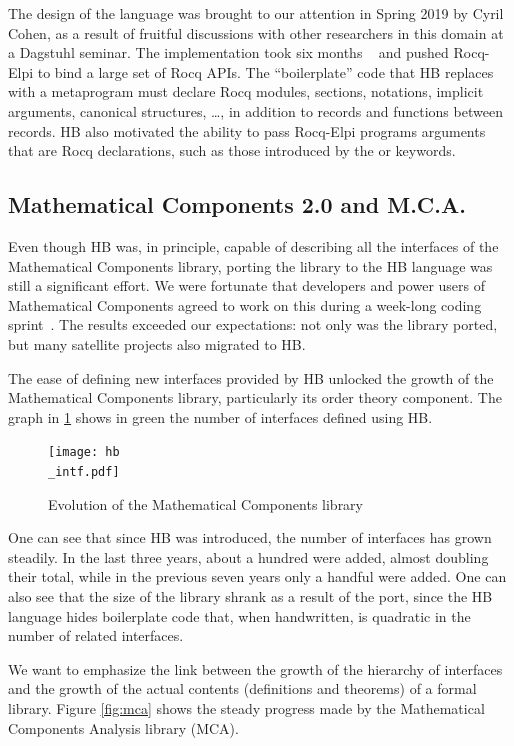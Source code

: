 \documentclass[a4paper, 11pt]{book}
\begin{document}
The design of the language was brought to our attention in Spring 2019 by Cyril
Cohen, as a result of fruitful discussions with other researchers in this
domain at a Dagstuhl seminar. The implementation took six months
~\cite{cohen_et_al:LIPIcs.FSCD.2020.34} and pushed Rocq-Elpi to bind a large
set of Rocq APIs. The ``boilerplate'' code that HB replaces with a metaprogram
must declare Rocq modules, sections, notations, implicit arguments, canonical
structures, \ldots, in addition to records and functions between records. HB
also motivated the ability to pass Rocq-Elpi programs arguments that are Rocq
declarations, such as those introduced by the  or
 keywords.


\subsection{Mathematical Components 2.0 and M.C.A.}


Even though HB was, in principle, capable of describing all the interfaces of
the Mathematical Components library, porting the library to the HB language was
still a significant effort. We were fortunate that developers and power users
of Mathematical Components agreed to work on this during a week-long coding
sprint~\cite{affeldt:hal-03463762}. The results exceeded our expectations: not
only was the library ported, but many satellite projects also migrated to HB.

The ease of defining new interfaces provided by HB unlocked the growth of the
Mathematical Components library, particularly its order theory component. The
graph in \cref{fig:mc} shows in green the number of interfaces defined using
HB.
\begin{figure}[!ht]
\texttt{[image: hb\\\_intf.pdf]}
\caption{Evolution of the Mathematical Components library\label{fig:mc}}
\end{figure}
One can see that since HB was introduced, the number of interfaces has grown
steadily. In the last three years, about a hundred were added, almost doubling
their total, while in the previous seven years only a handful were added. One
can also see that the size of the library shrank as a result of the
port, since the HB language hides boilerplate code that, when handwritten, is
quadratic in the number of related interfaces.

We want to emphasize the link between the growth of the hierarchy of
interfaces and the growth of the actual contents (definitions and theorems) of
a formal library. Figure \ref{fig:mca} shows the steady progress made by the
Mathematical Components Analysis library (MCA).
\end{document}
